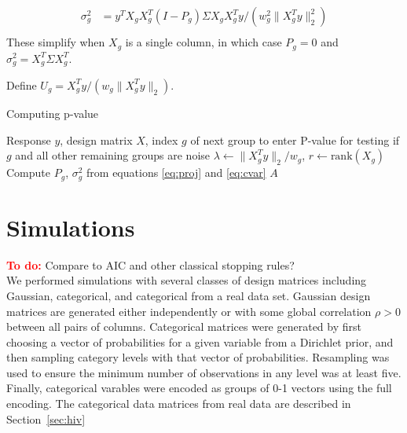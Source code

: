 \documentclass{imsart}
\newcommand{\todo}{\textcolor{red}{\textbf{To do: }}}
\newcommand{\norm}[1]{\lVert #1 \rVert}
\begin{document}
\begin{equation}
  \begin{aligned}
    \label{eq:cvar}
    \sigma^2_g &= y^TX_gX_g^T(I-P_g)\Sigma X_gX_g^Ty / (w_g^2 \norm{X_g^Ty}_2^2) \\
  \end{aligned}
\end{equation}
These simplify when $X_g$ is a single column, in which case $P_g = 0$
and $\sigma^2_g = X_g^T\Sigma X_g^T$. 

Define $U_g = X_g^Ty/(w_g\norm{X_g^Ty}_2)$.
\begin{algorithm}
  \caption{Computing p-value}
  \label{algo:pval}
  \begin{algorithmic}[1]
    \REQUIRE Response $y$, design matrix $X$, index $g$ of next group to enter
    \ENSURE P-value for testing if $g$ and all other remaining groups are noise
    \STATE $\lambda \gets \norm{X_g^Ty}_2/w_g$, $r \gets \text{rank}(X_g)$
    \STATE Compute $P_g$, $\sigma^2_g$ from equations \ref{eq:proj} and
      \ref{eq:cvar}
    \RETURN $A$
  \end{algorithmic}
\end{algorithm}




\section{Simulations}
\label{sec:simulations}

\todo Compare to AIC and other classical stopping rules? \\

We performed simulations with several classes of design matrices including
Gaussian, categorical, and categorical from a real data set. Gaussian
design matrices are generated either independently or with some global
correlation $\rho > 0$ between all pairs of columns. Categorical matrices
were generated by first choosing a vector of probabilities for a given
variable from a Dirichlet prior, and then sampling category levels with
that vector of probabilities. Resampling was used to ensure the minimum
number of observations in any level was at least five. Finally, categorical
varables were encoded as groups of 0-1 vectors using the full encoding.
The categorical data matrices from real data are described in
Section~\ref{sec:hiv}
\end{document}
